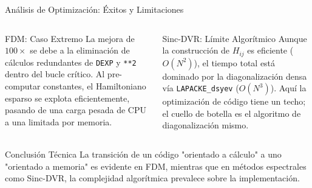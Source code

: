 \documentclass[aspectratio=169,10pt]{beamer}
\begin{document}
\begin{frame}{Análisis de Optimización: Éxitos y Limitaciones}

\begin{columns}[T]

\begin{successbox}{FDM: Caso Extremo}
\small
La mejora de $100\times$ se debe a la eliminación de cálculos redundantes de \texttt{DEXP} y \texttt{**2} dentro del bucle crítico. Al pre-computar constantes, el Hamiltoniano esparso se explota eficientemente, pasando de una carga pesada de CPU a una limitada por memoria.
\end{successbox}

\begin{alertbox}{Sinc-DVR: Límite Algorítmico}
\small
Aunque la construcción de $H_{ij}$ es eficiente ($O(N^2)$), el tiempo total está dominado por la diagonalización densa vía \texttt{LAPACKE\_dsyev} ($O(N^3)$). Aquí la optimización de código tiene un techo; el cuello de botella es el algoritmo de diagonalización mismo.
\end{alertbox}

\end{columns}

\vspace{0.5cm}
\begin{block}{Conclusión Técnica}
\footnotesize
La transición de un código "orientado a cálculo" a uno "orientado a memoria" es evidente en FDM, mientras que en métodos espectrales como Sinc-DVR, la complejidad algorítmica prevalece sobre la implementación.
\end{block}

\end{frame}
\end{document}
